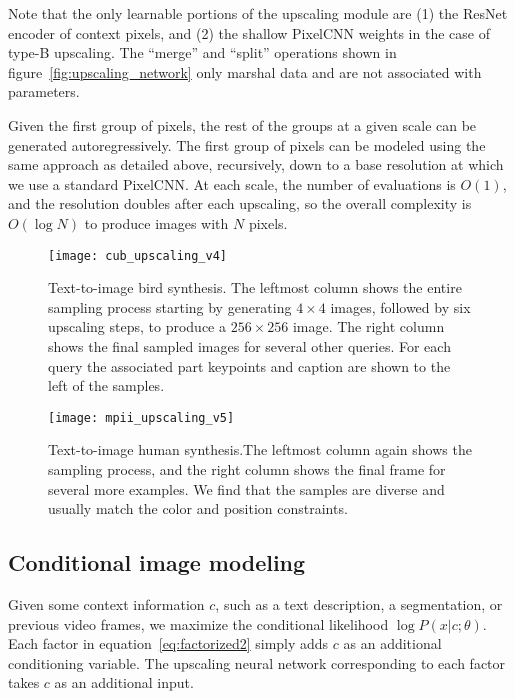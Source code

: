 \documentclass{article}
\begin{document}
Note that the only learnable portions of the upscaling module are (1) the ResNet encoder of context pixels, and (2) the shallow PixelCNN weights in the case of type-B upscaling.
The ``merge'' and ``split'' operations shown in figure~\ref{fig:upscaling_network} only marshal data and are not associated with parameters.

Given the first group of pixels, the rest of the groups at a given scale can be generated autoregressively.
The first group of pixels can be modeled using the same approach as detailed above, recursively, down to a base resolution at which we use a standard PixelCNN.
At each scale, the number of evaluations is $O(1)$, and the resolution doubles after each upscaling, so the overall complexity is $O(\log N)$ to produce images with $N$ pixels.



\begin{figure*}[t!]
\centering
\texttt{[image: cub\_upscaling\_v4]}
\vspace{-0.3in}
\caption{Text-to-image bird synthesis. The leftmost column shows the entire sampling process starting by generating $4 \times 4$ images, followed by six upscaling steps, to produce a $256 \times 256$ image. 
The right column shows the final sampled images for several other queries. For each query the associated part keypoints and caption are shown to the left of the samples.\label{fig:cub}}
\vspace{0.1in}
\texttt{[image: mpii\_upscaling\_v5]}
\vspace{-0.3in}
\caption{Text-to-image human synthesis.The leftmost column again shows the sampling process, and the right column shows the final frame for several more examples. We find that the samples are diverse and usually match the color and position constraints.\label{fig:mpii}}
\vspace{-0.1in}
\end{figure*}

\subsection{Conditional image modeling}
Given some context information $c$, such as a text description, a segmentation, or previous video frames, we maximize the conditional likelihood $\log P(x | c; \theta)$.
Each factor in equation~\ref{eq:factorized2} simply adds $c$ as an additional conditioning variable.
The upscaling neural network corresponding to each factor takes $c$ as an additional input.
\end{document}
